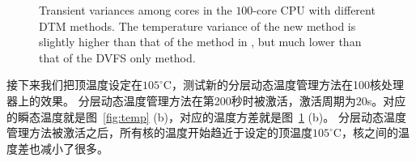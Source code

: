 \begin{figure}
  \centering

  \caption{Transient variances among cores in the $100$-core
    CPU with different DTM methods. The temperature variance of the
    new method is slightly higher than that of the method in
    \cite{MaWang:APCCAS'14}, but much lower than that of the DVFS only
  method.}\label{fig:var_comp}
\end{figure}

接下来我们把顶温度设定在$105^{\circ}$C，测试新的分层动态温度管理方法在100核处理器上的效果。
分层动态温度管理方法在第200秒时被激活，激活周期为$20$s。对应的瞬态温度就是图~\ref{fig:temp} (b)，对应的温度方差就是图~\ref{fig:var_comp} (b)。
分层动态温度管理方法被激活之后，所有核的温度开始趋近于设定的顶温度$105^{\circ}$C，核之间的温度差也减小了很多。

